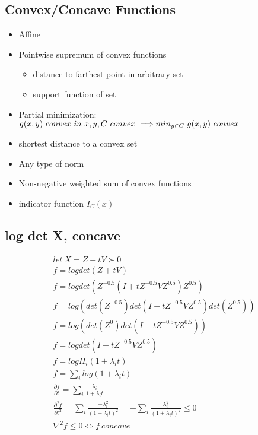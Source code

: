 \message{ !name(notebook.tex)}\documentclass[8pt]{report}
\begin{document}
\begin{multicols*}{2}
  \section{Convex/Concave Functions}

  \begin{itemize}
  \item Affine
  \item Pointwise supremum of convex functions
    \begin{itemize}
    \item distance to farthest point in arbitrary set
    \item support function of set
    \end{itemize}
  \item Partial minimization:\\
    $g(x,y)\ convex\ in\ x,y, C\ convex \implies\\ min_{y\in C}\ g(x,y)\ convex$
  \item shortest distance to a convex set
  \item Any type of norm
  \item Non-negative weighted sum of convex functions
  \item indicator function $I_C(x)$
  \end{itemize}
  
  \subsection{log det X, concave}
  \begin{align*}
    let\ X=Z+tV \succ 0\\
    f=log det(Z+tV)\\
    f=log det(Z^{-0.5}(I+tZ^{-0.5}VZ^{0.5})Z^{0.5})\\
    f=log (det(Z^{-0.5})det(I+tZ^{-0.5}VZ^{0.5})det(Z^{0.5}))\\
    f=log (det(Z^{0})det(I+tZ^{-0.5}VZ^{0.5}))\\
    f=log det(I+tZ^{-0.5}VZ^{0.5})\\
    f=log \Pi_i (1+\lambda_i t)\\
    f=\sum_i log(1+\lambda_i t)\\
    \frac{\partial f}{\partial t} = \sum_i \frac{\lambda_i}{1+\lambda_i t}\\
    \frac{\partial^2 f}{\partial t^2} = \sum_i \frac{-\lambda_i^2}{(1+\lambda_i t)^2} = -\sum_i \frac{\lambda_i^2}{(1+\lambda_i t)^2} \leq 0\\
    \nabla^2 f \leq 0 \iff f\ concave\\
  \end{align*}


\end{multicols*}
\end{document}
